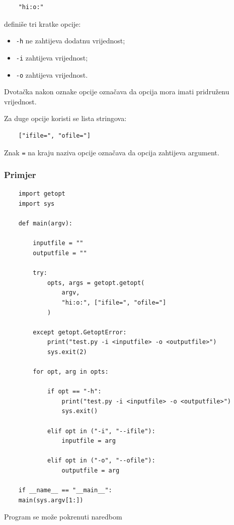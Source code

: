\begin{verbatim}
	"hi:o:"
\end{verbatim}

definiše tri kratke opcije:

\begin{itemize}
	\item \texttt{-h} ne zahtijeva dodatnu vrijednost;
	\item \texttt{-i} zahtijeva vrijednost;
	\item \texttt{-o} zahtijeva vrijednost.
\end{itemize}

Dvotačka nakon oznake opcije označava da opcija mora imati pridruženu vrijednost.

Za duge opcije koristi se lista stringova:

\begin{verbatim}
	["ifile=", "ofile="]
\end{verbatim}

Znak \texttt{=} na kraju naziva opcije označava da opcija zahtijeva argument.

\subsubsection*{Primjer}

\begin{verbatim}
	import getopt
	import sys
	
	def main(argv):
	
	    inputfile = ""
	    outputfile = ""
	
	    try:
	        opts, args = getopt.getopt(
	            argv,
	            "hi:o:", ["ifile=", "ofile="]
	        )
	
	    except getopt.GetoptError:
	        print("test.py -i <inputfile> -o <outputfile>")
	        sys.exit(2)
	
	    for opt, arg in opts:
	
	        if opt == "-h": 
	            print("test.py -i <inputfile> -o <outputfile>")
	            sys.exit()
	
	        elif opt in ("-i", "--ifile"):
	            inputfile = arg
	
	        elif opt in ("-o", "--ofile"):
                outputfile = arg
	
	if __name__ == "__main__":
	main(sys.argv[1:])
\end{verbatim}

Program se može pokrenuti naredbom

